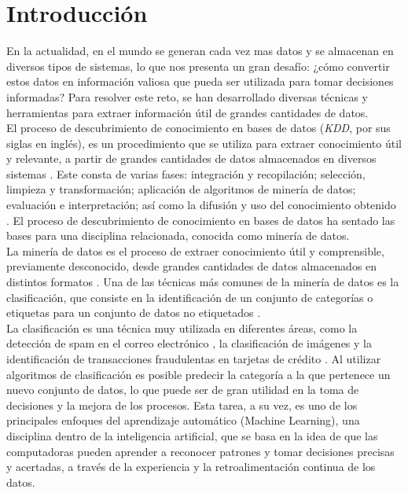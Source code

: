 \chapter*{Introducción}
En la actualidad, en el mundo se generan cada vez mas datos y se almacenan en diversos tipos de sistemas, lo que nos presenta un gran desafío: ¿cómo convertir estos datos en información valiosa que pueda ser utilizada para tomar decisiones informadas? Para resolver este reto, se han desarrollado diversas técnicas y herramientas para extraer información útil de grandes cantidades de datos. \\
El proceso de descubrimiento de conocimiento en bases de datos (\textit{KDD}, por sus siglas en inglés), es un procedimiento que se utiliza para extraer conocimiento útil y relevante, a partir de grandes cantidades de datos almacenados en diversos sistemas \citep{orallo2004}. Este consta de varias fases: integración y recopilación; selección, limpieza y transformación; aplicación de algoritmos de minería de datos; evaluación e interpretación; así como la difusión y uso del conocimiento obtenido \citep{Han2011}. El proceso de descubrimiento de conocimiento en bases de datos ha sentado las bases para una disciplina relacionada, conocida como minería de datos. \\
La minería de datos es el proceso de extraer conocimiento útil y comprensible, previamente desconocido, desde grandes cantidades de datos almacenados en distintos formatos \citep{orallo2004}. Una de las técnicas más comunes de la minería de datos es la clasificación, que consiste en la identificación de un conjunto de categorías o etiquetas para un conjunto de datos no etiquetados \citep{orallo2004}. \\
La clasificación es una técnica muy utilizada en diferentes áreas, como la detección de spam en el correo electrónico \citep{mendez2007sistemas}, la clasificación de imágenes \citep{borras2017clasificacion} y la identificación de transacciones fraudulentas en tarjetas de crédito \citep{dhankhad2018supervised}. Al utilizar algoritmos de clasificación es posible predecir la categoría a la que pertenece un nuevo conjunto de datos, lo que puede ser de gran utilidad en la toma de decisiones y la mejora de los procesos. Esta tarea, a su vez, es uno de los principales enfoques del aprendizaje automático (Machine Learning), una disciplina dentro de la inteligencia artificial, que se basa en la idea de que las computadoras pueden aprender a reconocer patrones y tomar decisiones precisas y acertadas, a través de la experiencia y la retroalimentación continua de los datos. \\
